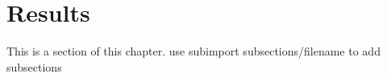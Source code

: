 \section{Results}
This is a section of this chapter.
use subimport {subsections/}{filename} to add subsections

